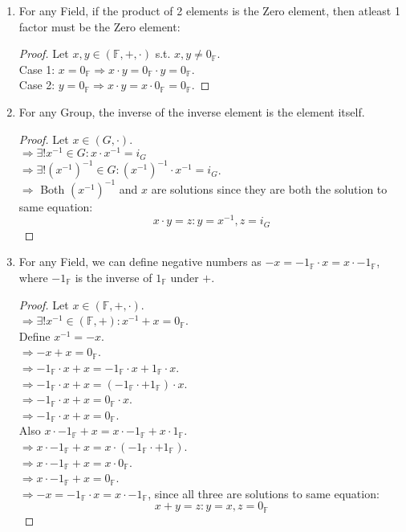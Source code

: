 \documentclass{article}
\begin{document}
\begin{enumerate}
				\item For any Field, if the product of 2 elements is the Zero element, then atleast 1 factor must be the Zero element:
				\begin{proof}
					Let $x, y \in (\mathbb{F}, +, \cdot)$ s.t. $x, y \neq 0_{\mathbb{F}}$.\\
					Case 1: $x = 0_{\mathbb{F}} \Rightarrow x \cdot y = 0_{\mathbb{F}} \cdot y = 0_{\mathbb{F}}$.\\
					Case 2: $y = 0_{\mathbb{F}} \Rightarrow x \cdot y = x \cdot 0_{\mathbb{F}} = 0_{\mathbb{F}}$.
				\end{proof}
				\item For any Group, the inverse of the inverse element is the element itself.
				\begin{proof}
					Let $x \in (G, \cdot)$.\\
					$\Rightarrow \exists ! x^{-1} \in G: x \cdot x^{-1} = i_G$ \\
					$\Rightarrow \exists ! ({x^{-1}})^{-1} \in G: ({x^{-1}})^{-1} \cdot x^{-1} = i_G$.\\
					$\Rightarrow$ Both $({x^{-1}})^{-1}$ and $x$ are solutions since they are both the solution to same equation:
					$$x \cdot y = z: y = x^{-1}, z = i_G$$
				\end{proof}

				\item For any Field, we can define negative numbers as $-x = -1_\mathbb{F} \cdot x = x \cdot -1_\mathbb{F}$, where $-1_\mathbb{F}$ is the inverse of $1_\mathbb{F}$ under $+$.
				\begin{proof}
					Let $x \in (\mathbb{F}, +, \cdot)$.\\
					$\Rightarrow \exists !x^{-1} \in (\mathbb{F}, +): x^{-1} + x = 0_\mathbb{F}$.\\
					Define $x^{-1} = -x$.\\
					$\Rightarrow -x + x = 0_\mathbb{F}$.\\
					$\Rightarrow -1_\mathbb{F} \cdot x + x = -1_\mathbb{F} \cdot x + 1_\mathbb{F} \cdot x$.\\
					$\Rightarrow -1_\mathbb{F} \cdot x + x = (-1_\mathbb{F} \cdot + 1_\mathbb{F}) \cdot x$.\\
					$\Rightarrow -1_\mathbb{F} \cdot x + x = 0_\mathbb{F} \cdot x$.\\
					$\Rightarrow -1_\mathbb{F} \cdot x + x = 0_\mathbb{F}$.\\
					Also $x \cdot -1_\mathbb{F} + x = x \cdot -1_\mathbb{F} + x \cdot 1_\mathbb{F}$.\\
					$\Rightarrow x \cdot -1_\mathbb{F} + x = x \cdot (-1_\mathbb{F} \cdot + 1_\mathbb{F})$.\\
					$\Rightarrow x \cdot -1_\mathbb{F} + x = x \cdot 0_\mathbb{F}$.\\
					$\Rightarrow x \cdot -1_\mathbb{F} + x = 0_\mathbb{F}$.\\
					$\Rightarrow -x = -1_\mathbb{F} \cdot x = x \cdot -1_\mathbb{F}$, since all three are solutions to same equation:
					$$x + y = z: y = x, z = 0_\mathbb{F}$$
				\end{proof}


\end{enumerate}
\end{document}

